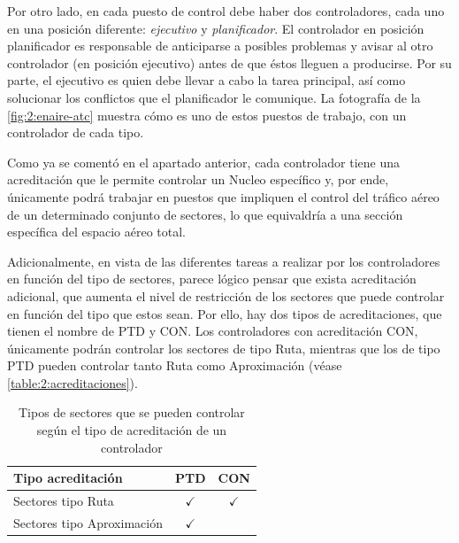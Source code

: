 Por otro lado, en cada puesto de control debe haber dos controladores, cada uno en una posición diferente: 
\textit{ejecutivo} y \textit{planificador}. El controlador en posición planificador es responsable de anticiparse a posibles problemas y avisar al otro controlador (en posición ejecutivo) antes de que éstos lleguen a producirse. Por su parte, el ejecutivo es quien debe llevar a cabo la tarea principal, así como solucionar los conflictos que el planificador le comunique. La fotografía de la \autoref{fig:2:enaire-atc} muestra cómo es uno de estos puestos de trabajo, con un controlador de cada tipo.

Como ya se comentó en el apartado anterior, cada controlador tiene una acreditación que le permite controlar un \gls{Nucleo} específico y, por ende, únicamente podrá trabajar en puestos que impliquen el control del 
tráfico aéreo de un determinado conjunto de sectores, lo que equivaldría a una sección específica del espacio aéreo total.

Adicionalmente, en vista de las diferentes tareas a realizar por los controladores en función del tipo de sectores, parece lógico pensar que exista acreditación adicional, que aumenta el nivel de restricción de los sectores que puede controlar en función del tipo que estos sean. Por ello, hay dos tipos de acreditaciones, que tienen el nombre de PTD y CON. Los controladores con acreditación CON, únicamente podrán controlar los sectores de tipo Ruta, mientras que los de tipo PTD pueden controlar tanto Ruta como Aproximación (véase \autoref{table:2:acreditaciones}).



\begin{table}[h]
	\centering
	\caption[Tipos de sectores según la acreditación del controlador]{Tipos de sectores que se pueden controlar según el tipo de acreditación de un controlador}
	\begin{tabular}{lcc}
		\hline
		\textbf{Tipo acreditación} & \textbf{PTD} & \textbf{CON} \\ \hline
		Sectores tipo Ruta         & $\checkmark$ & $\checkmark$ \\
		Sectores tipo Aproximación & $\checkmark$ &              \\ \hline
	\end{tabular}
	\label{table:2:acreditaciones}
\end{table}
%

